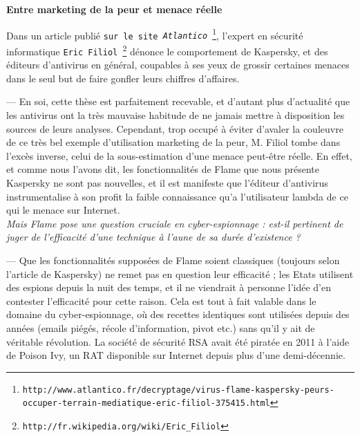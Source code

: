 \documentclass[11pt,twoside,a4paper]{article}
\begin{document}
\textbf{\large Entre marketing de la peur et menace r{\'e}elle} %

Dans un article publi{\'e} \texttt{sur le site \emph{Atlantico}~\footnote{\texttt{http://www.atlantico.fr/decryptage/virus-flame-kaspersky-peurs-occuper-terrain-mediatique-eric-filiol-375415.html}}}, l'expert en s{\'e}curit{\'e} informatique \texttt{Eric Filiol~\footnote{\texttt{http://fr.wikipedia.org/wiki/Eric\_Filiol}}} d{\'e}nonce le comportement de Kaspersky, et des {\'e}diteurs d'antivirus en g{\'e}n{\'e}ral, coupables {\`a} ses yeux de grossir certaines menaces dans le seul but de faire gonfler leurs chiffres d'affaires. %

--- En soi, cette th{\`e}se est parfaitement recevable, et d'autant plus d'actualit{\'e} que les antivirus ont la tr{\`e}s mauvaise habitude de ne jamais mettre {\`a} disposition les sources de leurs analyses. Cependant, trop occup{\'e} {\`a} {\'e}viter d'avaler la couleuvre de ce tr{\`e}s bel exemple d'utilisation marketing de la peur, M. Filiol tombe dans l'exc{\`e}s inverse, celui de la sous-estimation d'une menace peut-{\^e}tre r{\'e}elle. En effet, et comme nous l'avons dit, les fonctionnalit{\'e}s de Flame que nous pr{\'e}sente Kaspersky ne sont pas nouvelles, et il est manifeste que l'{\'e}diteur d'antivirus instrumentalise {\`a} son profit la faible connaissance qu'a l'utilisateur lambda de ce qui le menace sur Internet.~\\

\emph{Mais Flame pose une question cruciale en cyber-espionnage : est-il pertinent de juger de l'efficacit{\'e} d'une technique {\`a} l'aune de sa dur{\'e}e d'existence ?} %

--- Que les fonctionnalit{\'e}s suppos{\'e}es de Flame soient classiques (toujours selon l'article de Kaspersky) ne remet pas en question leur efficacit{\'e} ; les Etats utilisent des espions depuis la nuit des temps, et il ne viendrait {\`a} personne l'id{\'e}e d'en contester l'efficacit{\'e} pour cette raison. Cela est tout {\`a} fait valable dans le domaine du cyber-espionnage, o{\`u} des recettes identiques sont utilis{\'e}es depuis des ann{\'e}es (emails pi{\'e}g{\'e}s, r{\'e}cole d'information, pivot etc.) sans qu'il y ait de v{\'e}ritable r{\'e}volution. La soci{\'e}t{\'e} de s{\'e}curit{\'e} RSA avait {\'e}t{\'e} pirat{\'e}e en 2011 {\`a} l'aide de Poison Ivy, un RAT disponible sur Internet depuis plus d'une demi-d{\'e}cennie.~\\
\end{document}
